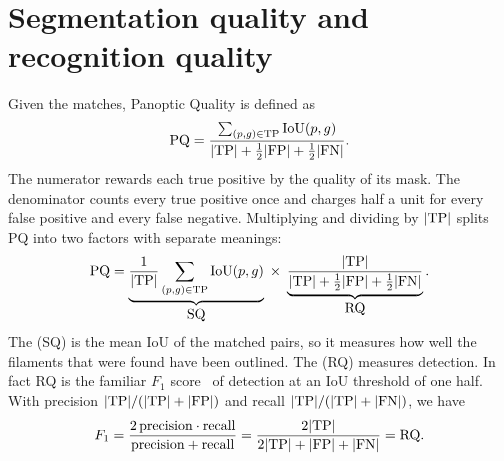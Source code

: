 \section{Segmentation quality and recognition quality}\label{sec:metric-sqrq}
Given the matches, Panoptic Quality is defined as
\begin{equation}
\mathrm{PQ}=\frac{\sum_{(p,g)\in\mathrm{TP}}\mathrm{IoU}(p,g)}{|\mathrm{TP}|+\tfrac12|\mathrm{FP}|+\tfrac12|\mathrm{FN}|}.
\label{eq:metric-pq}
\end{equation}
The numerator rewards each true positive by the quality of its mask. The denominator counts every
true positive once and charges half a unit for every false positive and every false negative.
Multiplying and dividing by $|\mathrm{TP}|$ splits PQ into two factors with separate meanings:
\begin{equation}
\mathrm{PQ}=\underbrace{\frac{1}{|\mathrm{TP}|}\sum_{(p,g)\in\mathrm{TP}}\mathrm{IoU}(p,g)}_{\textstyle\mathrm{SQ}}
\;\times\;
\underbrace{\frac{|\mathrm{TP}|}{|\mathrm{TP}|+\tfrac12|\mathrm{FP}|+\tfrac12|\mathrm{FN}|}}_{\textstyle\mathrm{RQ}}.
\label{eq:metric-sqrq}
\end{equation}
The  (SQ) is the mean IoU of the matched pairs, so it measures how
well the filaments that were found have been outlined. The  (RQ)
measures detection. In fact RQ is the familiar $F_1$ score~\citep{vanrijsbergen1979} of detection at an IoU threshold of one
half. With precision $|\mathrm{TP}|/(|\mathrm{TP}|+|\mathrm{FP}|)$ and recall $|\mathrm{TP}|/(|\mathrm{TP}|+|\mathrm{FN}|)$, we have
\begin{equation}
F_1=\frac{2\,\mathrm{precision}\cdot\mathrm{recall}}{\mathrm{precision}+\mathrm{recall}}
    =\frac{2|\mathrm{TP}|}{2|\mathrm{TP}|+|\mathrm{FP}|+|\mathrm{FN}|}=\mathrm{RQ} .
\end{equation}

